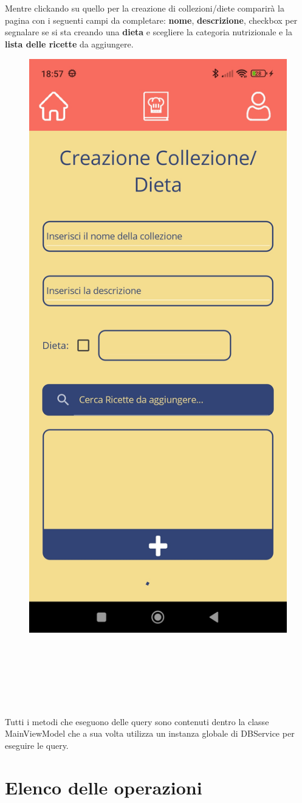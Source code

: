 ﻿\documentclass[a4paper,12pt]{report}
\begin{document}
\\\\\\\\\\\\\\Mentre clickando su quello per la creazione di collezioni/diete comparirà la pagina con i seguenti campi da completare:
\textbf{nome}, \textbf{descrizione}, checkbox per segnalare se si sta creando una \textbf{dieta} e scegliere la categoria nutrizionale e la \textbf{lista delle ricette} da aggiungere.
\begin{figure}[h!]
    \centering
    \includegraphics[width=0.5\linewidth]{app_images/CollectionCreation.jpg}
\end{figure}
\\\\\\\\\\\\Tutti i metodi che eseguono delle query sono contenuti dentro la classe MainViewModel che a sua volta utilizza un instanza globale di DBService per eseguire le query.
\section{Elenco delle operazioni}
\end{document}
